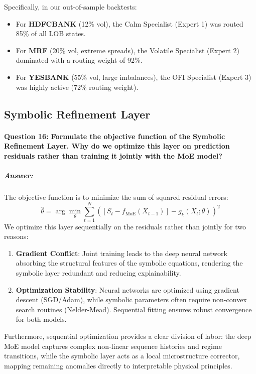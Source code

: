 \documentclass[11pt,a4paper]{article}
\begin{document}
Specifically, in our out-of-sample backtests:
\begin{itemize}
    \item For \textbf{HDFCBANK} (12\% vol), the Calm Specialist (Expert 1) was routed 85\% of all LOB states.
    \item For \textbf{MRF} (20\% vol, extreme spreads), the Volatile Specialist (Expert 2) dominated with a routing weight of 92\%.
    \item For \textbf{YESBANK} (55\% vol, large imbalances), the OFI Specialist (Expert 3) was highly active (72\% routing weight).
\end{itemize}

\subsection{Symbolic Refinement Layer}

\paragraph{Question 16: Formulate the objective function of the Symbolic Refinement Layer. Why do we optimize this layer on prediction residuals rather than training it jointly with the MoE model?}
\subparagraph{Answer:}
The objective function is to minimize the sum of squared residual errors:
\begin{equation}
    \hat{\theta} = \arg\min_{\theta} \sum_{t=1}^{N} \left( \left[ S_t - f_{\text{MoE}}(X_{t-1}) \right] - g_k(X_t; \theta) \right)^2
\end{equation}
We optimize this layer sequentially on the residuals rather than jointly for two reasons:
\begin{enumerate}
    \item \textbf{Gradient Conflict}: Joint training leads to the deep neural network absorbing the structural features of the symbolic equations, rendering the symbolic layer redundant and reducing explainability.
    \item \textbf{Optimization Stability}: Neural networks are optimized using gradient descent (SGD/Adam), while symbolic parameters often require non-convex search routines (Nelder-Mead). Sequential fitting ensures robust convergence for both models.
\end{enumerate}

Furthermore, sequential optimization provides a clear division of labor: the deep MoE model captures complex non-linear sequence histories and regime transitions, while the symbolic layer acts as a local microstructure corrector, mapping remaining anomalies directly to interpretable physical principles.
\end{document}
